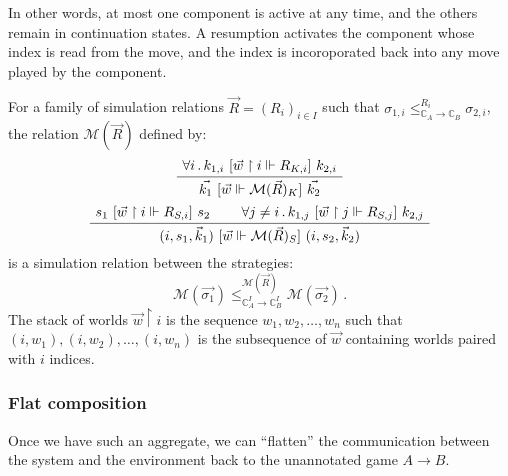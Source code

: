 In other words,
at most one component is active at any time,
and the others remain in continuation states.
A resumption activates the component whose index
is read from the move,
and the index is incoroporated back into
any move played by the component.

\begin{lemma} %
For a family of simulation relations $\vec{R} = (R_i)_{i \in I}$ such that
$\sigma_{1,i} \le_{\mathbb{C}_A \rightarrow \mathbb{C}_B}^{R_i} \sigma_{2,i}$,
the relation $\mathcal{M}(\vec{R})$ defined by:
\begin{gather*}
  \AxiomC{$\forall i \,.\,
    k_{1,i} \ifr{\vec{w} \restriction i \Vdash R_{K,i}} k_{2,i}$}
  \UnaryInfC{$\vec{k_1} \ifr{\vec{w} \Vdash \mathcal{M}(\vec{R})_K} \vec{k_2}$}
  \DisplayProof
  \\[.5ex]
  \AxiomC{$s_1 \ifr{\vec{w} \restriction i \Vdash R_{S,i}} s_2$}
  \AxiomC{$\forall j \ne i \,.\,
    k_{1,j} \ifr{\vec{w} \restriction j \Vdash R_{S,j}} k_{2,j}$}
  \BinaryInfC{$(i, s_1, \vec{k}_1)
    \ifr{\vec{w} \Vdash \mathcal{M}(\vec{R})_S}
    (i, s_2, \vec{k}_2)$}
  \DisplayProof
\end{gather*}
is a simulation relation between the strategies:
\[
  \mathcal{M}(\vec{\sigma_1})
  \le_{\mathbb{C}_A^I \rightarrow \mathbb{C}_B^I}^{\mathcal{M}(\vec{R})}
  \mathcal{M}(\vec{\sigma_2}) \, .
\]
The stack of worlds $\vec{w} \restriction i$
is the sequence $w_1, w_2, \ldots, w_n$
such that $(i, w_1), (i, w_2), \ldots, (i, w_n)$
is the subsequence of $\vec{w}$ containing worlds
paired with $i$ indices.
\end{lemma}


\subsubsection{Flat composition} %

Once we have such an aggregate,
we can ``flatten'' the communication between
the system and the environment
back to the unannotated game $A \rightarrow B$.

